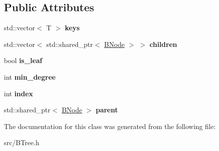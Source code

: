 \subsection*{Public Attributes}
\begin{DoxyCompactItemize}
\item 
\mbox{\label{classBTree_1_1BNode_a5fb27046a502d2a28fc539042a1bfd87}} 
std\+::vector$<$ T $>$ {\bfseries keys}
\item 
\mbox{\label{classBTree_1_1BNode_a3683e8ef7010edede627bdacb9d40025}} 
std\+::vector$<$ std\+::shared\+\_\+ptr$<$ \hyperlink{classBTree_1_1BNode}{B\+Node} $>$ $>$ {\bfseries children}
\item 
\mbox{\label{classBTree_1_1BNode_aeea14a23dfc45f162ecbbc736b24014a}} 
bool {\bfseries is\+\_\+leaf}
\item 
\mbox{\label{classBTree_1_1BNode_a9a108839cbc75c2c207d97140577bd7c}} 
int {\bfseries min\+\_\+degree}
\item 
\mbox{\label{classBTree_1_1BNode_a9b057ee85c9a950709afaee727515fab}} 
int {\bfseries index}
\item 
\mbox{\label{classBTree_1_1BNode_a5856f1fc1eb5e7e936d4deb50dc64a3c}} 
std\+::shared\+\_\+ptr$<$ \hyperlink{classBTree_1_1BNode}{B\+Node} $>$ {\bfseries parent}
\end{DoxyCompactItemize}


The documentation for this class was generated from the following file\+:\begin{DoxyCompactItemize}
\item 
src/B\+Tree.\+h\end{DoxyCompactItemize}
